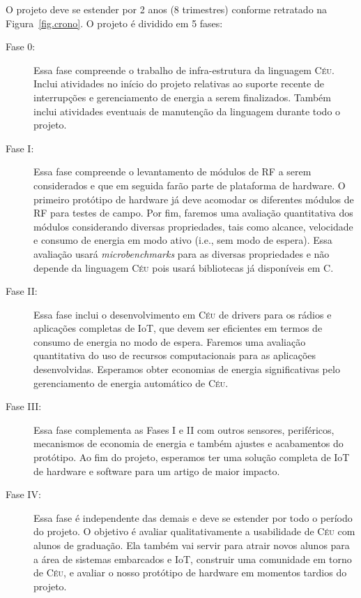 \documentclass[titlepage,12pt]{article}
\newcommand{\CEU}{\textsc{C\'{e}u}\xspace}
\begin{document}
O projeto deve se estender por 2 anos (8 trimestres) conforme retratado na
Figura~\ref{fig.crono}.
%
O projeto é dividido em 5 fases:
%
\begin{description}
\item[Fase 0:]
Essa fase compreende o trabalho de infra-estrutura da linguagem \CEU.
Inclui atividades no início do projeto relativas ao suporte recente de
interrupções e gerenciamento de energia a serem finalizados.
Também inclui atividades eventuais de manutenção da linguagem durante todo o
projeto.
%
\item[Fase I:]
Essa fase compreende o levantamento de módulos de RF a serem considerados e
que em seguida farão parte de plataforma de hardware.
O primeiro protótipo de hardware já deve acomodar os diferentes módulos de RF
para testes de campo.
Por fim, faremos uma avaliação quantitativa dos módulos considerando diversas
propriedades, tais como alcance, velocidade e consumo de energia em modo ativo
(i.e., sem modo de espera).
Essa avaliação usará \emph{microbenchmarks} para as diversas propriedades e não
depende da linguagem \CEU pois usará bibliotecas já disponíveis em C.
%
\item[Fase II:]
Essa fase inclui o desenvolvimento em \CEU de drivers para os rádios e
aplicações completas de IoT, que devem ser eficientes em termos de consumo de
energia no modo de espera.
Faremos uma avaliação quantitativa do uso de recursos computacionais para as
aplicações desenvolvidas.
Esperamos obter economias de energia significativas pelo gerenciamento de
energia automático de \CEU.
%
\item[Fase III:]
Essa fase complementa as Fases I e II com outros sensores, periféricos,
mecanismos de economia de energia e também ajustes e acabamentos do protótipo.
Ao fim do projeto, esperamos ter uma solução completa de IoT de hardware e
software para um artigo de maior impacto.
%
\item[Fase IV:]
Essa fase é independente das demais e deve se estender por todo o período do
projeto.
O objetivo é avaliar qualitativamente a usabilidade de \CEU com alunos de
graduação.
Ela também vai servir para atrair novos alunos para a área de sistemas
embarcados e IoT, construir uma comunidade em torno de \CEU, e avaliar o nosso
protótipo de hardware em momentos tardios do projeto.
\end{description}
\end{document}
